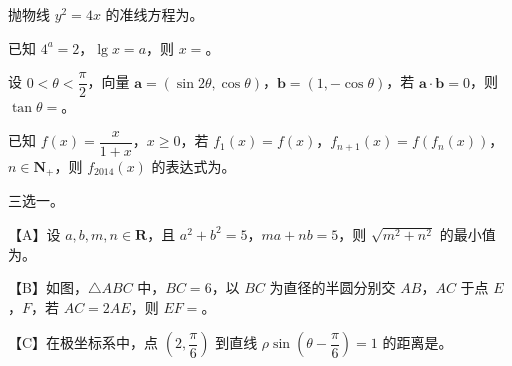 \begin{question}
抛物线 $y^2=4x$ 的准线方程为\gkblank{}。

\end{question}
\begin{question}
已知 $4^a=2$，$\lg x=a$，则 $x=$\gkblank{}。

\end{question}
\begin{question}
设 $0<\theta<\dfrac\pi2$，向量 $\boldsymbol a=(\sin2\theta,\cos\theta)$，$\boldsymbol b=(1,-\cos\theta)$，若 $\boldsymbol a\cdot\boldsymbol b=0$，则 $\tan\theta=$\gkblank{}。

\end{question}
\begin{question}
已知 $f(x)=\dfrac{x}{1+x}$，$x\geqslant 0$，若 $f_1(x)=f(x)$，$f_{n+1}(x)=f(f_n(x))$，$n\in\mathbf N_+$，则 $f_{2014}(x)$ 的表达式为\gkblank{}。

\Needspace{0.4\textheight}
\end{question}
\begin{question}
三选一。

【A】设 $a,b,m,n\in\mathbf R$，且 $a^2+b^2=5$，$ma+nb=5$，则 $\sqrt{m^2+n^2}$ 的最小值为\gkblank{}。

【B】如图，$\triangle ABC$ 中，$BC=6$，以 $BC$ 为直径的半圆分别交 $AB$，$AC$ 于点 $E$，$F$，若 $AC=2AE$，则 $EF=$\gkblank{}。
\nopagebreak[4]
\begin{center}\end{center}
\nopagebreak[4]
【C】在极坐标系中，点 $\left(2,\dfrac\pi6\right)$ 到直线 $\rho\sin\left(\theta-\dfrac\pi6\right)=1$ 的距离是\gkblank{}。

\end{question}

